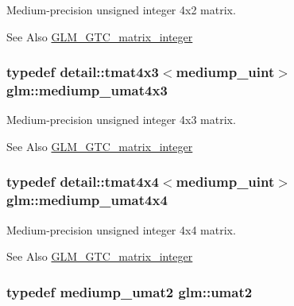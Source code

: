 Medium-\/precision unsigned integer 4x2 matrix. 

\begin{DoxySeeAlso}{See Also}
\hyperlink{group__gtc__matrix__integer}{G\-L\-M\-\_\-\-G\-T\-C\-\_\-matrix\-\_\-integer} 
\end{DoxySeeAlso}
\hypertarget{group__gtc__matrix__integer_gadf09c66253321ec625819792cacd5fc6}{
\subsubsection[{mediump\-\_\-umat4x3}]{\setlength{\rightskip}{0pt plus 5cm}typedef detail\-::tmat4x3$<$mediump\-\_\-uint$>$ {\bf glm\-::mediump\-\_\-umat4x3}}}\label{group__gtc__matrix__integer_gadf09c66253321ec625819792cacd5fc6}


Medium-\/precision unsigned integer 4x3 matrix. 

\begin{DoxySeeAlso}{See Also}
\hyperlink{group__gtc__matrix__integer}{G\-L\-M\-\_\-\-G\-T\-C\-\_\-matrix\-\_\-integer} 
\end{DoxySeeAlso}
\hypertarget{group__gtc__matrix__integer_ga27a135717a6c01fc900a8f10862718ac}{
\subsubsection[{mediump\-\_\-umat4x4}]{\setlength{\rightskip}{0pt plus 5cm}typedef detail\-::tmat4x4$<$mediump\-\_\-uint$>$ {\bf glm\-::mediump\-\_\-umat4x4}}}\label{group__gtc__matrix__integer_ga27a135717a6c01fc900a8f10862718ac}


Medium-\/precision unsigned integer 4x4 matrix. 

\begin{DoxySeeAlso}{See Also}
\hyperlink{group__gtc__matrix__integer}{G\-L\-M\-\_\-\-G\-T\-C\-\_\-matrix\-\_\-integer} 
\end{DoxySeeAlso}
\hypertarget{group__gtc__matrix__integer_gae2d45c058cfa0b60ab4df0cdda2d8516}{
\subsubsection[{umat2}]{\setlength{\rightskip}{0pt plus 5cm}typedef mediump\-\_\-umat2 {\bf glm\-::umat2}}}\label{group__gtc__matrix__integer_gae2d45c058cfa0b60ab4df0cdda2d8516}


